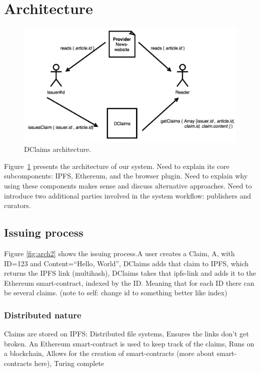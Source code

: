 
\section{Architecture}

\begin{figure}[t]
  \centering
  \includegraphics[width=0.8\columnwidth]{figures/arch.jpg}
  \caption{DClaims architecture.}
  \label{fig:arch}
\end{figure}

Figure~\ref{fig:arch} presents the architecture of our system. Need to  explain its core subcomponents: IPFS, Ethereum, and the browser plugin. Need to explain why using these components makes sense and discuss alternative approaches. Need to introduce two additional parties involved in the system workflow: publishers and curators.

\subsection{Issuing process}

Figure \ref{fig:arch2} shows the issuing process.A user creates a Claim, A, with ID=123 and Content=“Hello, World”, DClaims adds that claim to IPFS, which returns the IPFS link (multihash), DClaims takes that ipfs-link and adds it to the Ethereum smart-contract, indexed by the ID. Meaning that for each ID there can be several claims. (note to self: change id to something better like index)

\subsubsection{Distributed nature}

Claims are stored on IPFS: Distributed file systems, Ensures the links don’t get broken.
An Ethereum smart-contract is used to keep track of the claims, Runs on a blockchain, Allows for the creation of smart-contracts (more about smart-contracts here), Turing complete


